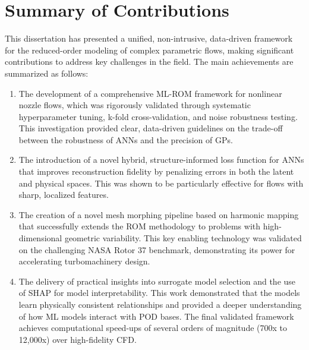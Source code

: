 \documentclass[12pt, a4paper]{report}
\begin{document}
\section{Summary of Contributions}
This dissertation has presented a unified, non-intrusive, data-driven framework for the reduced-order modeling of complex parametric flows, making significant contributions to address key challenges in the field. The main achievements are summarized as follows:
\begin{enumerate}
    \item The development of a comprehensive ML-ROM framework for nonlinear nozzle flows, which was rigorously validated through systematic hyperparameter tuning, k-fold cross-validation, and noise robustness testing. This investigation provided clear, data-driven guidelines on the trade-off between the robustness of ANNs and the precision of GPs.
    \item The introduction of a novel hybrid, structure-informed loss function for ANNs that improves reconstruction fidelity by penalizing errors in both the latent and physical spaces. This was shown to be particularly effective for flows with sharp, localized features.
    \item The creation of a novel mesh morphing pipeline based on harmonic mapping that successfully extends the ROM methodology to problems with high-dimensional geometric variability. This key enabling technology was validated on the challenging NASA Rotor 37 benchmark, demonstrating its power for accelerating turbomachinery design.
    \item The delivery of practical insights into surrogate model selection and the use of SHAP for model interpretability. This work demonstrated that the models learn physically consistent relationships and provided a deeper understanding of how ML models interact with POD bases. The final validated framework achieves computational speed-ups of several orders of magnitude (700x to 12,000x) over high-fidelity CFD.
\end{enumerate}
\end{document}

